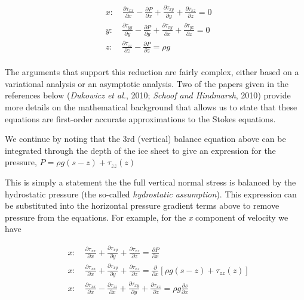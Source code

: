 \begin{align*}
  & x:\quad \frac{\partial \tau _{xx}}{\partial x}-\frac{\partial P}{\partial x}+\frac{\partial \tau _{xy}}{\partial y}+\frac{\partial \tau _{xz}}{\partial z}=0 \\ 
 & y:\quad \frac{\partial \tau _{yy}}{\partial y}-\frac{\partial P}{\partial y}+\frac{\partial \tau _{xy}}{\partial x}+\frac{\partial \tau _{yz}}{\partial z}=0 \\ 
 & z:\quad \frac{\partial \tau _{zz}}{\partial z}-\frac{\partial P}{\partial z}=\rho g \\ 
\end{align*}

The arguments that support this reduction are fairly complex, either based on a variational analysis or an asymptotic analysis. Two of the papers given in the references below ({\textit{Dukowicz et al.}, 2010}; {\textit{Schoof and Hindmarsh}, 2010}) provide more details on the mathematical background that allows us to state that these equations are first-order accurate approximations to the Stokes equations. 

We continue by noting that the 3rd (vertical) balance equation above can be integrated through the depth of the ice sheet to give an expression for the pressure, $P=\rho g\left( s-z \right)+\tau _{zz}(z)$

This is simply a statement the the full vertical normal stress is balanced by the hydrostatic pressure (the so-called \textit{hydrostatic assumption}). This expression can be substituted into the horizontal pressure gradient terms above to remove pressure from the equations. For example, for the \textit{x} component of velocity we have

\begin{align*}
  & x:\quad \frac{\partial \tau _{xx}}{\partial x}+\frac{\partial \tau _{xy}}{\partial y}+\frac{\partial \tau _{xz}}{\partial z}=\frac{\partial P}{\partial x} \\ 
 & x:\quad \frac{\partial \tau _{xx}}{\partial x}+\frac{\partial \tau _{xy}}{\partial y}+\frac{\partial \tau _{xz}}{\partial z}=\frac{\partial }{\partial x}\left[ \rho g\left( s-z \right)+\tau _{zz}(z) \right] \\ 
 & x:\quad \frac{\partial \tau _{xx}}{\partial x}-\frac{\partial \tau _{zz}}{\partial x}+\frac{\partial \tau _{xy}}{\partial y}+\frac{\partial \tau _{xz}}{\partial z}=\rho g\frac{\partial s}{\partial x} \\ 
\end{align*}

